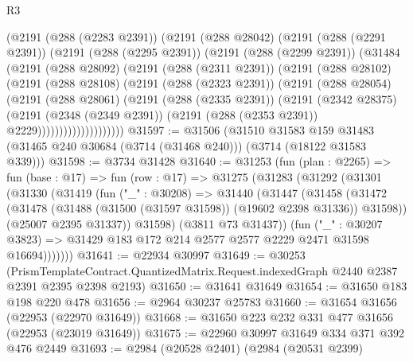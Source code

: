 \begin{lexlean}{R3}
\begin{coremodule}
          (@2191
            (@288 (@2283 @2391))
            (@2191
              (@288 @28042)
              (@2191
                (@288 (@2291 @2391))
                (@2191
                  (@288 (@2295 @2391))
                  (@2191
                    (@288 (@2299 @2391))
                    (@31484
                      (@2191
                        (@288 @28092)
                        (@2191
                          (@288 (@2311 @2391))
                          (@2191
                            (@288 @28102)
                            (@2191
                              (@288 @28108)
                              (@2191
                                (@288 (@2323 @2391))
                                (@2191
                                  (@288 @28054)
                                  (@2191
                                    (@288 @28061)
                                    (@2191
                                      (@288 (@2335 @2391))
                                      (@2191
                                        (@2342 @28375)
                                        (@2191
                                          (@2348 (@2349 @2391))
                                          (@2191 (@288 (@2353 @2391)) @2229))))))))))))))))))))
@31597 := @31506
    (@31510
      @31583
      @159
      @31483
      (@31465 @240 @30684 (@3714 (@31468 @240)))
      (@3714 (@18122 @31583 @339)))
@31598 := @3734 @31428
@31640 := @31253
    (fun (plan : @2265) =>
    fun (base : @17) =>
    fun (row : @17) =>
    @31275
      (@31283
        (@31292
          (@31301
            (@31330
              (@31419
                (fun ("_" : @30208) =>
                @31440
                  (@31447
                    (@31458
                      (@31472
                        (@31478 (@31488 (@31500 (@31597 @31598)) (@19602 @2398 @31336)) @31598))
                      (@25007 @2395 @31337))
                    @31598)
                  (@3811 @73 @31437))
                (fun ("_" : @30207 @3823) =>
                @31429 @183 @172 @214 @2577 @2577 @2229 @2471 @31598 @16694)))))))
@31641 := @22934 @30997
@31649 := @30253
    (PrismTemplateContract.QuantizedMatrix.Request.indexedGraph @2440 @2387 @2391 @2395 @2398 @2193)
@31650 := @31641 @31649
@31654 := @31650 @183 @198 @220 @478
@31656 := @2964 @30237 @25783
@31660 := @31654 @31656 (@22953 (@22970 @31649))
@31668 := @31650 @223 @232 @331 @477 @31656 (@22953 (@23019 @31649))
@31675 := @22960 @30997 @31649 @334 @371 @392 @476 @2449
@31693 := @2984
    (@20528 @2401)
    (@2984
      (@20531 @2399)

\end{coremodule}
\end{lexlean}
